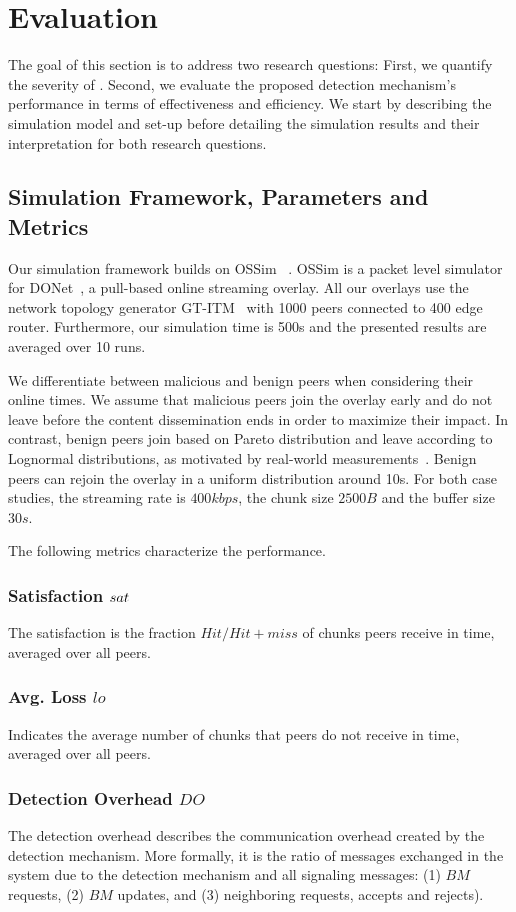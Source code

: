 \section{Evaluation}
\label{sec:eval}

The goal of this section is to address two research questions: 
First, we quantify the severity of \drop. 
Second, we evaluate the proposed detection mechanism's performance in terms of effectiveness and efficiency. 
We start by describing the simulation model and set-up before detailing the simulation results and their interpretation for both research questions.


\subsection{Simulation Framework, Parameters and Metrics}
Our simulation framework builds on OSSim ~\cite{nguyen2013ossim}. 
OSSim is a packet level simulator for DONet~\cite{zhang2005coolstreaming}, a pull-based online streaming overlay.
All our overlays use the network topology generator GT-ITM~\cite{GT} with 1000 peers connected to 400 edge router. Furthermore, our simulation time is 500s and the presented results are averaged over 10 runs. 

We differentiate between malicious and benign peers when considering their online times. 
We assume that malicious peers join the overlay early and do not leave before the content dissemination ends in order to maximize their impact. 
In contrast,  benign peers join based on Pareto distribution and leave according to Lognormal distributions, as motivated by real-world measurements~\cite{distribution}.
Benign peers can rejoin the overlay in a uniform distribution around 10s. For both case studies, the streaming rate is $400kbps$, the chunk size $2500B$ and the buffer size $30s$.


The following metrics characterize the performance.
\subsubsection*{Satisfaction $sat$} The satisfaction is the fraction $Hit/Hit+miss$ of chunks peers receive in time, averaged over all peers. 
\subsubsection*{Avg. Loss $lo$} Indicates the average number of chunks that peers do not receive in time, averaged over all peers. 
\subsubsection*{Detection Overhead $DO$} The detection overhead describes the communication overhead created by the detection mechanism. 
More formally, it is the ratio of messages exchanged in the system due to the detection mechanism and all signaling messages: (1) $BM$ requests, (2) $BM$ updates, and (3) neighboring requests, accepts and rejects).
